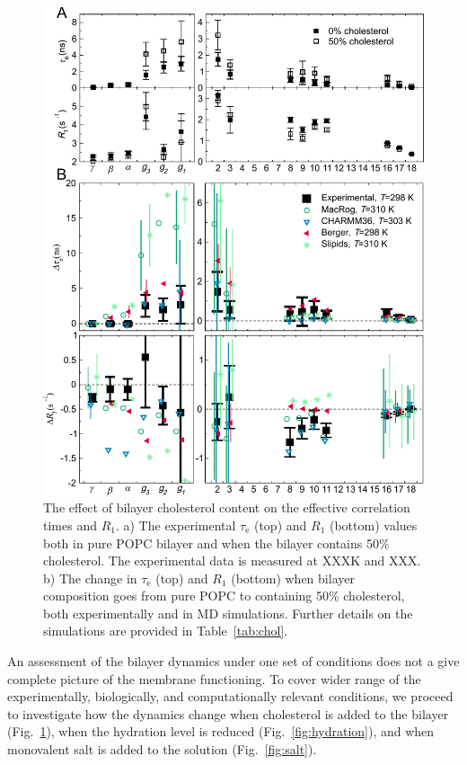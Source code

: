 \documentclass[journal=jpcbfk,manuscript=article,layout=twocolumn]{achemso}
\begin{document}

\begin{figure}[ht!]

\centering
\includegraphics[scale=0.49]{cholesterol.pdf}  
\caption{The effect of bilayer cholesterol content on the effective correlation times and $R_{1}$. a) The experimental $\tau_\mathrm{e}$ (top) and $R_{1}$ (bottom) values both in pure POPC bilayer and when the bilayer contains 50\% cholesterol. The experimental data is measured at XXXK and XXX. b) The change in $\tau_\mathrm{e}$ (top) and $R_{1}$ (bottom) when bilayer composition goes from pure POPC to containing 50\% cholesterol, both experimentally and in MD simulations. Further details on the simulations are provided in Table~\ref{tab:chol}.}
\label{fig:chol}


\end{figure}

An assessment of the bilayer dynamics under one set of conditions does not a give complete picture of the membrane functioning. To cover wider range of the experimentally, biologically, and computationally relevant conditions, we proceed to investigate how the dynamics change when cholesterol is added to the bilayer (Fig.~\ref{fig:chol}), when the hydration level is reduced (Fig.~\ref{fig:hydration}), and when monovalent salt is added to the solution (Fig.~\ref{fig:salt}).
\end{document}
